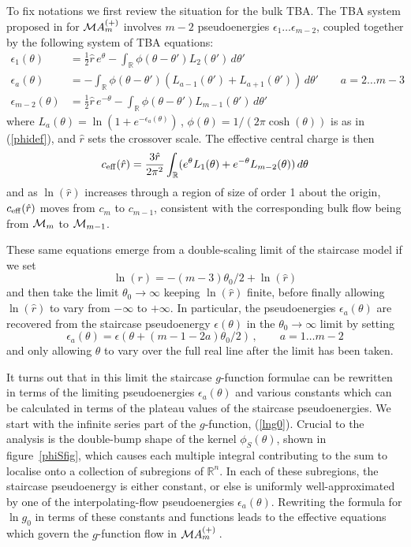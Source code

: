 \documentclass[11pt]{article}
\newcommand\RR{{\mathbb R}}
\newcommand\phup{^{\phantom o}}
\newcommand{\CM}{{\cal M}}
\newcommand\beq{\begin{equation}}
\newcommand\eeq{\end{equation}}
\newcommand\nn{\nonumber}
\newcommand{\tz}{\theta_0}
\newcommand{\go}{g\phup_{0}}
\begin{document}
To fix notations we first review the situation for the bulk TBA. The 
TBA system proposed in \cite{Zamolodchikov:1991vx} for $\CM A^{(+)}_m$
involves $m-2$ pseudoenergies $\epsilon_1\dots\epsilon_{m-2}$, coupled
together by the following system of TBA equations:
\begin{align}
\epsilon_1(\theta)&=\frac{1}{2}\hat{r}\,e^\theta
-\int_{\RR}\phi(\theta-\theta')L_2(\theta')\,d\theta' \nn\\
\epsilon_a(\theta)&=
-\int_{\RR}\phi(\theta-\theta')
(L_{a-1}(\theta')+L_{a{+}1}(\theta'))\,d\theta'\qquad a=2\dots m{-}3 \nn\\
\epsilon_{m-2}(\theta)&=\frac{1}{2}\hat{r}\,e^{-\theta}
-\int_{\RR}\phi(\theta-\theta')L_{m-1}(\theta')\,d\theta' 
\label{bulkmasslessTBA}
\end{align}
where $L_a(\theta)=\ln(1+e^{-\epsilon_a(\theta)})$\,,
$\phi(\theta)=1/(2\pi\cosh(\theta))$ is as in (\ref{phidef}), and
$\hat{r}$ sets the crossover scale. The effective central charge
is then
\beq
c_{\rm eff}(\hat{r})=\frac{3\hat{r}}{2\pi^2}\int_{\RR}
(e^{\theta}L_1(\theta)+
e^{-\theta}L_{m-2}(\theta))\,d\theta
\eeq
and as $\ln(\hat{r})$ increases through a region of size of order 1
about the origin, $c_{\rm eff}(\hat{r})$ moves from $c_m$ to
$c_{m-1}$, consistent with the corresponding bulk flow being from $\CM_m$ 
to $\CM_{m-1}$.

These same equations emerge from a double-scaling limit of
the staircase model if we set
\beq
\ln(r) = -(m{-}3)\tz/2 + \ln(\hat{r})
\eeq
and then take the limit $\tz\to\infty$ keeping $\ln(\hat{r})$ 
finite, before finally allowing $\ln(\hat{r})$ to vary from
$-\infty$ to $+\infty$. In particular, the pseudoenergies
$\epsilon_a(\theta)$ are recovered from the staircase pseudoenergy
$\epsilon(\theta)$ in the $\theta_0\to\infty$ limit by setting
\beq
\epsilon_a(\theta)= \epsilon(\theta+(m{-}1{-}2a)\tz/2)\,,\qquad
a=1\dots m{-}2
\label{epsadef}
\eeq
and only allowing $\theta$ to vary over the full real line
after the limit has been taken.

It turns out that in this limit the staircase $g$-function formulae 
can be rewritten in terms of the limiting pseudoenergies
$\epsilon_a(\theta)$ and various constants which can be calculated in
terms of the plateau values of the staircase pseudoenergies. 
We start with the infinite series part of the $g$-function,
(\ref{lng0}). Crucial to the analysis 
is the double-bump shape of the kernel $\phi_S(\theta)$, shown in 
figure~\ref{phiSfig}, which causes each multiple integral contributing
to the sum to localise onto a collection of subregions of
$\RR^n$. In each of these subregions, the staircase pseudoenergy is
either constant, or else is uniformly well-approximated by one of the
interpolating-flow pseudoenergies $\epsilon_a(\theta)$. Rewriting the
formula for $\ln\go$ in terms of these constants and functions leads
to the effective equations which govern the $g$-function flow in $\CM
A^{(+)}_m$\,.
\end{document}
